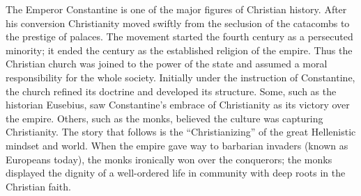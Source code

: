 
\begin{partsummary}
The Emperor Constantine is one of the major figures of Christian history. After his conversion
Christianity moved swiftly from the seclusion of the catacombs to the prestige of palaces. The
movement started the fourth century as a persecuted minority; it ended the century as the
established religion of the empire. Thus the Christian church was joined to the power of the state
and assumed a moral responsibility for the whole society. Initially under the instruction of
Constantine, the church refined its doctrine and developed its structure. Some, such as the
historian Eusebius, saw Constantine’s embrace of Christianity as its victory over the empire.
Others, such as the monks, believed the culture was capturing Christianity. The story that follows
is the “Christianizing” of the great Hellenistic mindset and world. When the empire gave way to
barbarian invaders (known as Europeans today), the monks ironically won over the conquerors; the
monks displayed the dignity of a well-ordered life in community with deep roots in the Christian
faith.
\end{partsummary}

